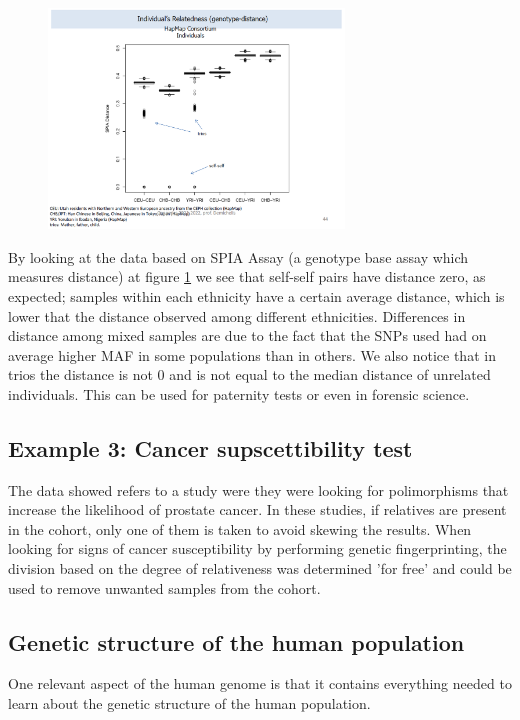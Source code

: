 \begin{figure}[h]
	\centering
	\includegraphics[width = 0.7\textwidth]{trios.PNG}
	\caption{\label{fig: trios}}
\end{figure}

By looking at the data based on SPIA Assay (a genotype base assay which measures
distance) at figure \ref{fig: trios} we see that self-self pairs have distance
zero, as expected; samples within each ethnicity have a certain average
distance, which is lower that the distance observed among different ethnicities.
Differences in distance among mixed samples are due to the fact that the SNPs
used had on average higher MAF in some populations than in others. We also
notice that in trios the distance is not 0 and is not equal to the median
distance of unrelated individuals. This can be used for paternity tests or even
in forensic science.

\subsection{Example 3: Cancer supscettibility test}
The data showed refers to a study were they were looking for polimorphisms that
increase the likelihood of prostate cancer. In these studies, if relatives are
present in the cohort, only one of them is taken to avoid skewing the results.
When looking for signs of cancer susceptibility by performing genetic
fingerprinting, the division based on the degree of relativeness was determined
'for free' and could be used to remove unwanted samples from the cohort.


\subsection{Genetic structure of the human population}

One relevant aspect of the human genome is that it contains everything needed to
learn about the genetic structure of the human population. 

